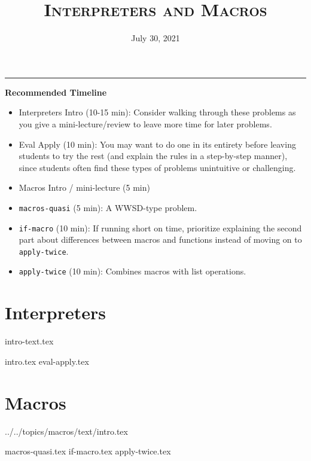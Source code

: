 \documentclass{exam}
\title{\textsc{Interpreters and Macros}}
\date{July 30, 2021}
\begin{document}
\maketitle
\rule{\textwidth}{0.15em}
\fontsize{12}{15}\selectfont


\begin{guide}
\textbf{Recommended Timeline}
\begin{itemize}
  \item Interpreters Intro (10-15 min): Consider walking through these problems as 
  you give a mini-lecture/review to leave more time for later problems.
  \item Eval Apply (10 min): You may want to do one in its entirety before leaving students to try the rest
  (and explain the rules in a step-by-step manner), since students often find these types of problems unintuitive or challenging.
  \item Macros Intro / mini-lecture (5 min)
  \item \lstinline{macros-quasi} (5 min): A WWSD-type problem.
  \item \lstinline{if-macro} (10 min): If running short on time, prioritize explaining the second part about differences between macros and functions instead of moving on to \lstinline{apply-twice}.
  \item \lstinline{apply-twice} (10 min): Combines macros with list operations.
\end{itemize}
\newpage
\end{guide}

\section{Interpreters}
{intro-text.tex}
\begin{questions}
{intro.tex}
{eval-apply.tex}
\end{questions}

\newpage
\section{Macros}
 {../../topics/macros/text/}{intro.tex}
\begin{questions}
{macros-quasi.tex}
{if-macro.tex}
{apply-twice.tex}
\end{questions}
\end{document}

